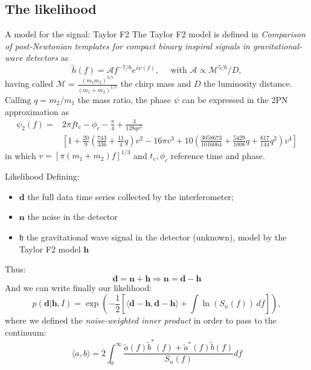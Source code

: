 \documentclass[
10pt,
aspectratio=169,
]{beamer}
\begin{document}
\subsection{The likelihood}
\begin{frame}{A model for the signal: Taylor F2}
The Taylor F2 model is defined in \textit{Comparison of post-Newtonian templates for compact binary inspiral signals in
gravitational-wave detectors} as 
\begin{equation}
   \tilde{h}(f) = \mathcal{A}f^{-7/6}e^{i\psi(f)}, \quad\text{ with } \mathcal{A}\propto \mathcal{M}^{5/6}/D,
\end{equation}
having called $\mathcal{M}=\frac{(m_1 m_2)^{3/5}}{(m_1 + m_2)^{1/5}}$ the chirp mass and $D$ the luminosity distance. \\

\vfill
Calling $q=m_2/m_1$ the mass ratio, the phase $\psi$ can be expressed in the 2PN approximation as
\begin{align*}
\psi_{2}(f) = &2\pi f t_c - \phi_c - \frac{\pi}{4} + \frac{3}{128q v^5}  \\
&\left[1 + \frac{20}{9} \left(\frac{743}{336} + \frac{11}{4} q\right) v^2 - 16\pi v^3+ 10 \left( \frac{3058673}{1016064} + \frac{5429}{1008} q + \frac{617}{144} q^2 \right) v^4\right]
\end{align*}
in which $v=[\pi (m_1+m_2) f]^{1/3}$ and $t_c, \phi_c$ reference time and phase.
\end{frame}
\begin{frame}{Likelihood}
Defining:
\begin{itemize}
    \item $\boldsymbol{d}$ the full data time series collected by the interferometer;
    \item $\boldsymbol{n}$ the noise in the detector
    \item $\mathfrak{h}$ the gravitational wave signal in the detector (unknown), model by the Taylor F2 model $\boldsymbol{h}$
\end{itemize}
Thus:
\[ \boldsymbol{d} = \boldsymbol{n} + \boldsymbol{h} \Longrightarrow \boldsymbol{n} = \boldsymbol{d}-\boldsymbol{h}\]
And we can write finally our likelihood:
\begin{equation}
    p(\boldsymbol{d}|\boldsymbol{h}, I) = \exp\left(-\frac{1}{2} \left[ \langle \boldsymbol{d} - \boldsymbol{h}, \boldsymbol{d} -\boldsymbol{h} \rangle + \int\ln(S_n(f)) \, df \right] \right),
\end{equation}
where we defined the \textit{noise-weighted inner product} in order to pass to the continuum:
\[\langle a,b\rangle = 2\int_0^{\infty}\frac{\tilde{a}(f)\tilde{b}^*(f)+\tilde{a}^*(f)\tilde{b}(f)}{S_n(f)}df\]
\end{frame}
\end{document}
